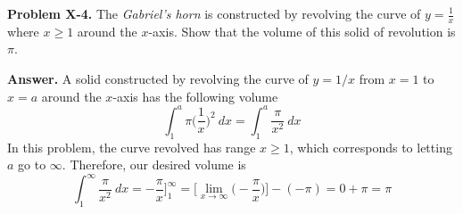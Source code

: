 \documentclass[11pt,letterpaper]{article}
\newcounter{problem}
\newcommand{\problem}[1]{
	\noindent \textbf{Problem #1. }%
}
\newcommand{\answer}{\noindent \textbf{Answer. }}
\begin{document}
\pagebreak

\problem{X-4} The \textit{Gabriel's horn} is constructed by revolving the curve of $y = \frac{1}{x}$ where $x \ge 1$ around the $x$-axis.  Show that the
volume of this solid of revolution is $\pi$.

\smallskip

\answer A solid constructed by revolving the curve of $y = 1/x$ from $x=1$ to $x=a$ around the $x$-axis has the following volume
\[\int_1^a \pi \Big(\frac{1}{x}\Big)^2~dx = \int_1^a \frac{\pi}{x^2}~dx \]
In this problem, the curve revolved has range $x \ge 1$, which corresponds to letting $a$ go to $\infty$.  Therefore, our desired volume is
\[\int_1^\infty \frac{\pi}{x^2}~dx = -\frac{\pi}{x}\Big]_1^\infty = \Big[\lim_{x \rightarrow \infty} \Big(-\frac{\pi}{x}\Big)\Big] - (-\pi) = 0 + \pi = \pi\]
\end{document}
